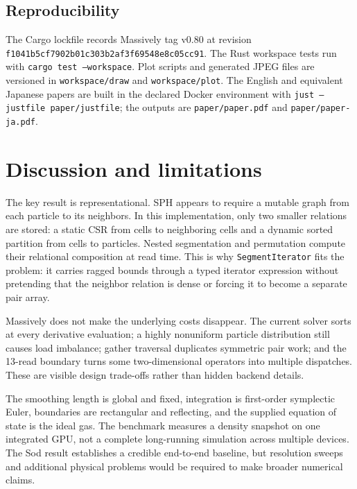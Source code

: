 \documentclass[a4paper,10pt]{article}
\newcommand{\code}[1]{\texttt{#1}}
\begin{document}
\subsection{Reproducibility}

The Cargo lockfile records Massively tag v0.80 at revision
\code{f1041b5cf7902b01c303b2af3f69548e8c05cc91}.  The Rust workspace tests run
with \code{cargo test --workspace}.  Plot scripts and generated JPEG files are
versioned in \code{workspace/draw} and \code{workspace/plot}.  The English and
equivalent Japanese papers are built in the declared Docker environment with
\code{just --justfile paper/justfile}; the outputs are
\code{paper/paper.pdf} and \code{paper/paper-ja.pdf}.

\section{Discussion and limitations}

The key result is representational.  SPH appears to require a mutable graph from
each particle to its neighbors.  In this implementation, only two smaller
relations are stored: a static CSR from cells to neighboring cells and a dynamic
sorted partition from cells to particles.  Nested segmentation and permutation
compute their relational composition at read time.  This is why
\code{SegmentIterator} fits the problem: it carries ragged bounds through a
typed iterator expression without pretending that the neighbor relation is
dense or forcing it to become a separate pair array.

Massively does not make the underlying costs disappear.  The current solver
sorts at every derivative evaluation; a highly nonuniform particle distribution
still causes load imbalance; gather traversal duplicates symmetric pair work;
and the 13-read boundary turns some two-dimensional operators into multiple
dispatches.  These are visible design trade-offs rather than hidden backend
details.

The smoothing length is global and fixed, integration is first-order
symplectic Euler, boundaries are rectangular and reflecting, and the supplied
equation of state is the ideal gas.
The benchmark measures a density snapshot on one integrated GPU, not a complete
long-running simulation across multiple devices.  The Sod result establishes a
credible end-to-end baseline, but resolution sweeps and additional physical
problems would be required to make broader numerical claims.
\end{document}
